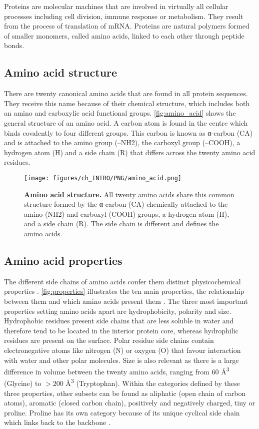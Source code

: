 Proteins are molecular machines that are involved in virtually all cellular processes including cell division, immune response or metabolism. They result from the process of translation of mRNA. Proteins are natural polymers formed of smaller monomers, called amino acids, linked to each other through peptide bonds.

\subsection{Amino acid structure}

There are twenty canonical amino acids that are found in all protein sequences. They receive this name because of their chemical structure, which includes both an amino and carboxylic acid functional groups. \autoref{fig:amino_acid} shows the general structure of an amino acid. A carbon atom is found in the centre which binds covalently to four different groups. This carbon is known as α-carbon (CA) and is attached to the amino group (--NH2), the carboxyl group (--COOH), a hydrogen atom (H) and a side chain (R) that differs across the twenty amino acid residues.

\begin{figure}[htbp!]
    \centering
    \texttt{[image: figures/ch\_INTRO/PNG/amino\_acid.png]}
    \caption[Amino acid structure]{\textbf{Amino acid structure.} All twenty amino acids share this common structure formed by the α-carbon (CA) chemically attached to the amino (NH2) and carboxyl (COOH) groups, a hydrogen atom (H), and a side chain (R). The side chain is different and defines the amino acids.}
    \label{fig:amino_acid}
\end{figure}

\subsection{Amino acid properties}

The different side chains of amino acids confer them distinct physicochemical properties \cite{SNEATH_1966_PROPERTIES}. \autoref{fig:properties} illustrates the ten main properties, the relationship between them and which amino acids present them \cite{TAYLOR_1986_PROPERTIES}. The three most important properties setting amino acids apart are hydrophobicity, polarity and size. Hydrophobic residues present side chains that are less soluble in water and therefore tend to be located in the interior protein core, whereas hydrophilic residues are present on the surface. Polar residue side chains contain electronegative atoms like nitrogen (N) or oxygen (O) that favour interaction with water and other polar molecules. Size is also relevant as there is a large difference in volume between the twenty amino acids, ranging from 60 \AA{}\textsuperscript{3} (Glycine) to $>$200 \AA{}\textsuperscript{3} (Tryptophan). Within the categories defined by these three properties, other subsets can be found as aliphatic (open chain of carbon atoms), aromatic (closed carbon chain), positively and negatively charged, tiny or proline. Proline has its own category because of its unique cyclical side chain which links back to the backbone \cite{ZVELEBIL_1987_PREDICTION}.


